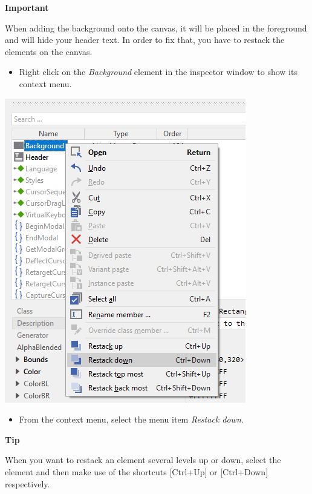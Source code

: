 \documentclass[
  a4paper,
,tablecaptionabove
]{scrbook}
\renewenvironment{quote}{\begin{customblockquote}\list{}{\rightmargin=0em\leftmargin=0em}%
\item\relax\color{blockquote-text}\ignorespaces}{\unskip\unskip\endlist\end{customblockquote}}
\begin{document}
\begin{quote}
\textbf{Important}

When adding the background onto the canvas, it will be placed in the
foreground and will hide your header text. In order to fix that, you
have to restack the elements on the canvas.

\begin{itemize}
\item
  Right click on the \emph{Background} element in the inspector window
  to show its context menu.
\end{itemize}

\includegraphics{./../asciidoc/modules/ROOT/assets/images/firstcomponent/RestackElements.png}

\begin{itemize}
\item
  From the context menu, select the menu item \emph{Restack down}.
\end{itemize}

\begin{quote}
\textbf{Tip}

When you want to restack an element several levels up or down, select
the element and then make use of the shortcuts {[}Ctrl+Up{]} or
{[}Ctrl+Down{]} respectively.
\end{quote}
\end{quote}
\end{document}
